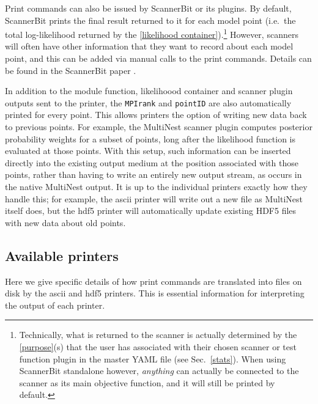 \documentclass[pdftex,twocolumn,epjc3_preprint,runningheads]{svjour3}
\renewcommand{\_}{\discretionary{\underscore}{}{\underscore}}
\newcommand\cpp[1]{{\lstinline!#1!}}  %
\newcommand{\cross}[1]{\ref{#1}}
\newcommand{\scannerbit}{\textsf{ScannerBit}\xspace}
\newcommand\MultiNest{\textsf{MultiNest}\xspace}
\newcommand\YAML{\textsf{YAML}\xspace}
\begin{document}
Print commands can also be issued by \scannerbit or its plugins. By default, \scannerbit prints the final result returned to it for each model point (i.e.\ the total log-likelihood returned by the \cross{likelihood container}).\footnote{Technically, what is returned to the scanner is actually determined by the \cross{purpose}(s) that the user has associated with their chosen scanner or test function plugin in the master \YAML file (see Sec.\ \ref{stats}).  When using \scannerbit standalone however, \textit{anything} can actually be connected to the scanner as its main objective function, and it will still be printed by default.}  However, scanners will often have other information that they want to record about each model point, and this can be added via manual calls to the print commands.  Details can be found in the \scannerbit paper \cite{ScannerBit}.

In addition to the module function, likelihoood container and scanner plugin outputs sent to the printer, the \cpp{MPIrank} and \cpp{pointID} are also automatically printed for every point. This allows printers the option of writing new data back to previous points.  For example, the \MultiNest scanner plugin computes posterior probability weights for a subset of points, long after the likelihood function is evaluated at those points.  With this setup, such information can be inserted directly into the existing output medium at the position associated with those points, rather than having to write an entirely new output stream, as occurs in the native \MultiNest output. It is up to the individual printers exactly how they handle this; for example, the \textsf{ascii} printer will write out a new file as \MultiNest itself does, but the \textsf{hdf5} printer will automatically update existing \textsf{HDF5} files with new data about old points.

\subsection{Available printers}
\label{output_specific}

Here we give specific details of how print commands are translated into files on disk by the \textsf{ascii} and \textsf{hdf5} printers. This is essential information for interpreting the output of each printer.
\end{document}
